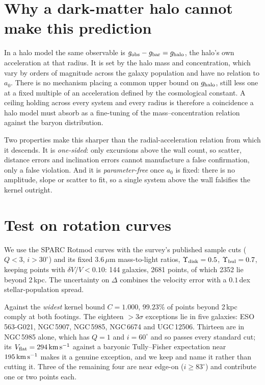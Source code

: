 \documentclass[11pt,letterpaper]{article}
\begin{document}
\section{Why a dark-matter halo cannot make this prediction}
In a halo model the same observable is $g_{\rm obs}-g_{\rm bar}=g_{\rm halo}$, the halo's own acceleration at that radius. It is set by the halo mass and concentration, which vary by orders of magnitude across the galaxy population and have no relation to $a_0$. There is no mechanism placing a common upper bound on $g_{\rm halo}$, still less one at a fixed multiple of an acceleration defined by the cosmological constant. A ceiling holding across every system and every radius is therefore a coincidence a halo model must absorb as a fine-tuning of the mass--concentration relation against the baryon distribution.

Two properties make this sharper than the radial-acceleration relation from which it descends. It is \emph{one-sided}: only excursions above the wall count, so scatter, distance errors and inclination errors cannot manufacture a false confirmation, only a false violation. And it is \emph{parameter-free} once $a_0$ is fixed: there is no amplitude, slope or scatter to fit, so a single system above the wall falsifies the kernel outright.

\section{Test on rotation curves}
We use the SPARC Rotmod curves \cite{sparc} with the survey's published sample cuts ($Q<3$, $i>30^\circ$) and its fixed $3.6\,\mu$m mass-to-light ratios, $\Upsilon_{\rm disk}=0.5$, $\Upsilon_{\rm bul}=0.7$, keeping points with $\delta V/V<0.10$: 144 galaxies, 2681 points, of which 2352 lie beyond 2\,kpc. The uncertainty on $\Delta$ combines the velocity error with a $0.1$\,dex stellar-population spread.

Against the \emph{widest} kernel bound $C=1.000$, $99.23\%$ of points beyond 2\,kpc comply at both footings. The eighteen $>3\sigma$ exceptions lie in five galaxies: ESO\,563-G021, NGC\,5907, NGC\,5985, NGC\,6674 and UGC\,12506. Thirteen are in NGC\,5985 alone, which has $Q=1$ and $i=60^\circ$ and so passes every standard cut; its $V_{\rm flat}=294\,{\rm km\,s^{-1}}$ against a baryonic Tully--Fisher expectation near $195\,{\rm km\,s^{-1}}$ makes it a genuine exception, and we keep and name it rather than cutting it. Three of the remaining four are near edge-on ($i\ge83^\circ$) and contribute one or two points each.
\end{document}
